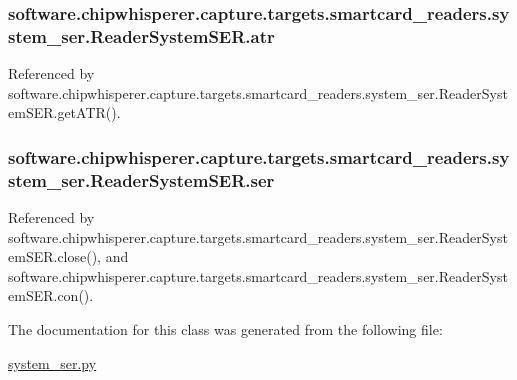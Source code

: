\subsubsection[{atr}]{\setlength{\rightskip}{0pt plus 5cm}software.\+chipwhisperer.\+capture.\+targets.\+smartcard\+\_\+readers.\+system\+\_\+ser.\+Reader\+System\+S\+E\+R.\+atr}\label{classsoftware_1_1chipwhisperer_1_1capture_1_1targets_1_1smartcard__readers_1_1system__ser_1_1ReaderSystemSER_ac0c204ad36bbc68b8daca000ea544c86}


Referenced by software.\+chipwhisperer.\+capture.\+targets.\+smartcard\+\_\+readers.\+system\+\_\+ser.\+Reader\+System\+S\+E\+R.\+get\+A\+T\+R().

\hypertarget{classsoftware_1_1chipwhisperer_1_1capture_1_1targets_1_1smartcard__readers_1_1system__ser_1_1ReaderSystemSER_a1366a3ad94087e220983c9c33093855e}{}
\subsubsection[{ser}]{\setlength{\rightskip}{0pt plus 5cm}software.\+chipwhisperer.\+capture.\+targets.\+smartcard\+\_\+readers.\+system\+\_\+ser.\+Reader\+System\+S\+E\+R.\+ser}\label{classsoftware_1_1chipwhisperer_1_1capture_1_1targets_1_1smartcard__readers_1_1system__ser_1_1ReaderSystemSER_a1366a3ad94087e220983c9c33093855e}


Referenced by software.\+chipwhisperer.\+capture.\+targets.\+smartcard\+\_\+readers.\+system\+\_\+ser.\+Reader\+System\+S\+E\+R.\+close(), and software.\+chipwhisperer.\+capture.\+targets.\+smartcard\+\_\+readers.\+system\+\_\+ser.\+Reader\+System\+S\+E\+R.\+con().



The documentation for this class was generated from the following file\+:\begin{DoxyCompactItemize}
\item 
\hyperlink{system__ser_8py}{system\+\_\+ser.\+py}\end{DoxyCompactItemize}

